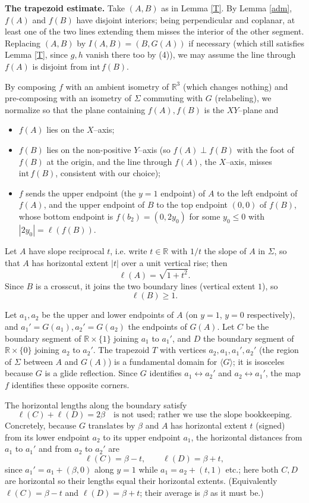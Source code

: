 \medskip
\noindent\textbf{The trapezoid estimate.}
Take $(A,B)$ as in Lemma \ref{T}. By Lemma \ref{adm}, $f(A)$ and $f(B)$ have
disjoint interiors; being perpendicular and coplanar, at least one of the two lines
extending them misses the interior of the other segment. Replacing $(A,B)$ by
$I(A,B)=(B,G(A))$ if necessary (which still satisfies Lemma \ref{T}, since $g,h$
vanish there too by (4)), we may assume the line through $f(A)$ is disjoint from
$\mathrm{int}\,f(B)$.

By composing $f$ with an ambient isometry of $\mathbb{R}^3$ (which changes nothing)
and pre-composing with an isometry of $\Sigma$ commuting with $G$ (relabeling), we
normalize so that the plane containing $f(A),f(B)$ is the $XY$--plane and
\begin{itemize}
\item $f(A)$ lies on the $X$--axis;
\item $f(B)$ lies on the non-positive $Y$--axis (so $f(A)\perp f(B)$ with the foot of
$f(B)$ at the origin, and the line through $f(A)$, the $X$--axis, misses
$\mathrm{int}\,f(B)$, consistent with our choice);
\item $f$ sends the upper endpoint (the $y=1$ endpoint) of $A$ to the left endpoint
of $f(A)$, and the upper endpoint of $B$ to the top endpoint $(0,0)$ of $f(B)$,
whose bottom endpoint is $f(b_2)=(0,2y_0)$ for some $y_0\le 0$ with
$|2y_0|=\ell(f(B))$.
\end{itemize}

Let $A$ have slope reciprocal $t$, i.e. write $t\in\mathbb{R}$ with $1/t$ the slope
of $A$ in $\Sigma$, so that $A$ has horizontal extent $|t|$ over a unit vertical
rise; then
\[
\ell(A)=\sqrt{1+t^2}.
\]
Since $B$ is a crosscut, it joins the two boundary lines (vertical extent $1$), so
\[
\ell(B)\ge 1.
\]

Let $a_1,a_2$ be the upper and lower endpoints of $A$ (on $y=1$, $y=0$
respectively), and $a_1'=G(a_1),a_2'=G(a_2)$ the endpoints of $G(A)$. Let $C$ be
the boundary segment of $\mathbb{R}\times\{1\}$ joining $a_1$ to $a_1'$, and $D$ the
boundary segment of $\mathbb{R}\times\{0\}$ joining $a_2$ to $a_2'$. The trapezoid
$T$ with vertices $a_2,a_1,a_1',a_2'$ (the region of $\Sigma$ between $A$ and
$G(A)$) is a fundamental domain for $\langle G\rangle$; it is isosceles because $G$
is a glide reflection. Since $G$ identifies $a_1\leftrightarrow a_2'$ and
$a_2\leftrightarrow a_1'$, the map $f$ identifies these opposite corners.

The horizontal lengths along the boundary satisfy
\[
\ell(C)+\ell(D)=2\beta\quad\text{is not used; rather we use the slope bookkeeping.}
\]
Concretely, because $G$ translates by $\beta$ and $A$ has horizontal extent $t$
(signed) from its lower endpoint $a_2$ to its upper endpoint $a_1$, the horizontal
distances from $a_1$ to $a_1'$ and from $a_2$ to $a_2'$ are
\[
\ell(C)=\beta-t,\qquad \ell(D)=\beta+t,
\]
since $a_1'=a_1+(\beta,0)$ along $y=1$ while $a_1=a_2+(t,1)$ etc.; here both $C,D$
are horizontal so their lengths equal their horizontal extents. (Equivalently
$\ell(C)=\beta-t$ and $\ell(D)=\beta+t$; their average is $\beta$ as it must be.)

